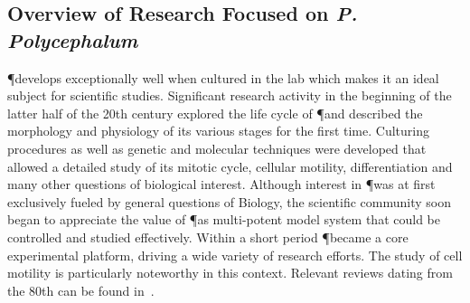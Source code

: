 		\FloatBarrier

	\subsection{Overview of Research Focused on \textit{P. Polycephalum}}

		\P develops exceptionally well when cultured in the lab which makes it an ideal subject for scientific studies. Significant research activity in the beginning of the latter half of the 20th century explored the life cycle of \P and described the morphology and physiology of its various stages for the first time. Culturing procedures as well as genetic and molecular techniques were developed that allowed a detailed study of its mitotic cycle, cellular motility, differentiation and many other questions of biological interest. Although interest in \P was at first exclusively fueled by general questions of Biology, the scientific community soon began to appreciate the value of \P as multi-potent model system that could be controlled and studied effectively. Within a short period \P became a core experimental platform, driving a wide variety of research efforts. The study of cell motility is particularly noteworthy in this context. Relevant reviews dating from the 80th can be found in~\cite{dove1980growth, aldrich2012cell,sauer1982developmental,Sauer1986}.

